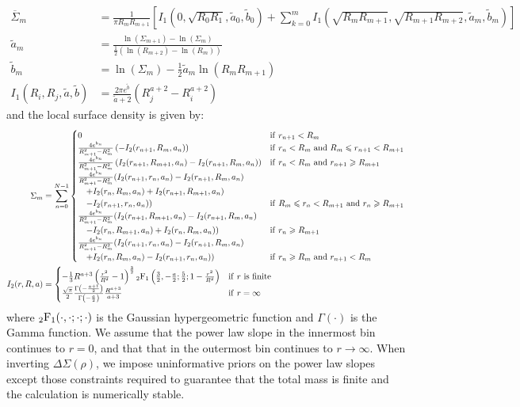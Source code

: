 \documentclass[usenatbib]{mnras}
\begin{document}
\begin{align}
\overline{\Sigma}_m &= \frac{1}{\pi R_mR_{m+1}}\left[I_1(0, \sqrt{R_0R_1}, \tilde{a}_0, \tilde{b}_0) + 
\sum_{k=0}^m I_1(\sqrt{R_mR_{m+1}},\sqrt{R_{m+1}R_{m+2}}, \tilde{a}_m, \tilde{b}_m)\right]\\
  \tilde{a}_m &= \frac{\ln(\Sigma_{m+1})-\ln(\Sigma_m)}{\frac{1}{2}\left(\ln(R_{m+2})-\ln(R_m)\right)}\\
  \tilde{b}_m &= \ln(\Sigma_m) - \frac{1}{2}\tilde{a}_m\ln(R_mR_{m+1})\\
  I_1(R_i,R_j,\tilde{a},\tilde{b}) &= \frac{2\pi e^{\tilde{b}}}{\tilde{a}+2}\left(R_j^{a+2} - R_i^{a+2}\right)
\end{align}
\noindent and the local surface density is given by:
\begin{align}
  \Sigma_m &= \sum_{n=0}^{N-1}
  \begin{cases}
    0 & {\rm if}\ r_{n+1} < R_m\\
    \frac{4e^{b_n}}{R_{m+1}^2-R_m^2} \left(-I_2(r_{n+1},R_m,a_n)\right) & {\rm if}\ r_n < R_m\ {\rm and}\ R_m \leq r_{n+1} < R_{m+1}\\
    \frac{4e^{b_n}}{R_{m+1}^2-R_m^2} \left(I_2(r_{n+1},R_{m+1},a_n)-I_2(r_{n+1},R_m,a_n)\right) & {\rm if}\ r_n < R_m\ {\rm and}\ r_{n+1} \geq R_{m+1}\\
    \frac{4e^{b_n}}{R_{m+1}^2-R_m^2} (I_2(r_{n+1},r_n,a_n)-I_2(r_{n+1},R_m,a_n)\\ \quad +I_2(r_n,R_m,a_n)+I_2(r_{n+1},R_{m+1},a_n)\\ \quad -I_2(r_{n+1},r_n,a_n)) & {\rm if}\ R_m \leq r_n < R_{m+1}\ {\rm and}\ r_n \geq R_{m+1}\\
    \frac{4e^{b_n}}{R_{m+1}^2-R_m^2} (I_2(r_{n+1},R_{m+1},a_n)-I_2(r_{n+1},R_m,a_n)\\ \quad -I_2(r_n,R_{m+1},a_n)+I_2(r_n,R_m,a_n)) & {\rm if}\ r_n \geq R_{m+1}\\
    \frac{4e^{b_n}}{R_{m+1}^2-R_m^2} (I_2(r_{n+1},r_n,a_n)-I_2(r_{n+1},R_m,a_n)\\ \quad +I_2(r_n,R_m,a_n)-I_2(r_{n+1},r_n,a_n)) & {\rm if}\ r_n \geq R_m\ {\rm and}\ r_{n+1} < R_m\\
  \end{cases}\\
  I_2(r,R,a) &=
  \begin{cases}
    -\frac{1}{3}R^{a+3}\left(\frac{r^2}{R^2}-1\right)^{\frac{3}{2}}{}_2{\rm F}_1\left(\frac{3}{2},-\frac{a}{2};\frac{5}{2};1-\frac{r^2}{R^2}\right) & {\rm if}\ r\ {\rm is}\ {\rm finite}\\
    \frac{\sqrt{\pi}}{2}\frac{\Gamma\left(-\frac{a+1}{2}\right)}{\Gamma\left(-\frac{a}{2}\right)}\frac{R^{a+3}}{a+3} & {\rm if}\ r=\infty
  \end{cases}
\end{align}
where ${}_2{\rm F}_1(\cdot,\cdot;\cdot;\cdot)$ is the Gaussian hypergeometric function and $\Gamma(\cdot)$ is the Gamma function. We assume that the power law slope in the innermost bin continues to $r=0$, and that that in the outermost bin continues to $r\rightarrow\infty$. When inverting $\Delta\Sigma(\rho)$, we impose uninformative priors on the power law slopes except those constraints required to guarantee that the total mass is finite and the calculation is numerically stable.

\bsp	%
\label{lastpage}
\end{document}
